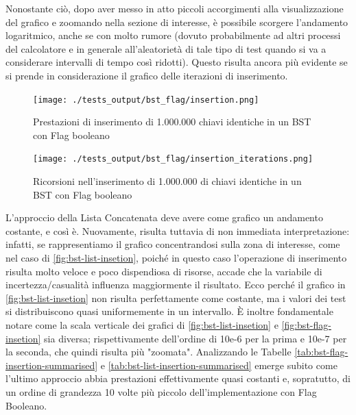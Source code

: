 \documentclass{article}
\begin{document}
Nonostante ciò, dopo aver messo in atto piccoli accorgimenti alla visualizzazione del grafico e zoomando nella sezione di interesse, è possibile scorgere l'andamento logaritmico, anche se con molto rumore (dovuto probabilmente ad altri processi del calcolatore e in generale all'aleatorietà di tale tipo di test quando si va a considerare intervalli di tempo così ridotti).
Questo risulta ancora più evidente se si prende in considerazione il grafico delle iterazioni di inserimento.

\begin{figure}[htbp]
 \begin{minipage}{0.5\textwidth}
    \centering
    \texttt{[image: ./tests\_output/bst\_flag/insertion.png]}
    \caption{Prestazioni di inserimento di 1.000.000 chiavi identiche in un BST con Flag booleano}
    \label{fig:bst-flag-insetion}
  \end{minipage}
      \hspace{0.05\textwidth}
  \begin{minipage}{0.5\textwidth}
    \centering
    \texttt{[image: ./tests\_output/bst\_flag/insertion\_iterations.png]}
    \caption{Ricorsioni nell'inserimento di 1.000.000 di chiavi identiche in un BST con Flag booleano}
    \label{fig:bst-flag-insetion-iterations}
  \end{minipage}%
\end{figure}

\vspace{10px}
L'approccio della Lista Concatenata deve avere come grafico un andamento costante, e così è. Nuovamente, risulta tuttavia di non immediata interpretazione: infatti, se rappresentiamo il grafico concentrandosi sulla zona di interesse, come nel caso di \cref{fig:bst-list-insetion}, poiché in questo caso l'operazione di inserimento risulta molto veloce e poco dispendiosa di risorse, accade che la variabile di incertezza/casualità influenza maggiormente il risultato.
Ecco perché il grafico in \cref{fig:bst-list-insetion} non risulta perfettamente come costante, ma i valori dei test si distribuiscono quasi uniformemente in un intervallo. È inoltre fondamentale notare come la scala verticale dei grafici di   \cref{fig:bst-list-insetion} e  \cref{fig:bst-flag-insetion} sia diversa; rispettivamente dell'ordine di 10e-6 per la prima e 10e-7 per la seconda, che quindi risulta più "zoomata". Analizzando le Tabelle \ref{tab:bst-flag-insertion-summarised} e \ref{tab:bst-list-insertion-summarised} emerge subito come l'ultimo approccio abbia prestazioni effettivamente quasi costanti e, sopratutto, di un ordine di grandezza 10 volte più piccolo dell'implementazione con Flag Booleano.
\end{document}
